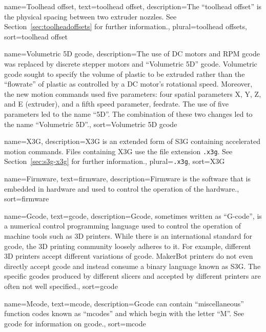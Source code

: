 {
        name={Toolhead offset},
        text={toolhead offset},
        description={The ``toolhead offset'' is the physical spacing between
two extruder nozzles.  See Section~\ref{sec:toolheadoffsets} for further
information.},
        plural={toolhead offsets},
        sort=toolhead offset
}

{
        name={Volumetric 5D gcode},
        description={The use of DC motors and RPM gcode was replaced
by discrete stepper motors and ``Volumetric 5D'' gcode.  Volumetric gcode
sought to specify the volume of plastic to be extruded rather than the
``flowrate'' of plastic as controlled by a DC motor's rotational speed.
Moreover, the new motion commands used five parameters: four spatial
parameters X, Y, Z, and E (extruder), and a fifth speed parameter, feedrate.
The use of five parameters led to the name ``5D''.  The combination of
these two changes led to the name ``Volumetric 5D''.},
        sort=Volumetric 5D gcode
}

{
        name={X3G},
        description={X3G is an extended form of \gls{S3G} containing accelerated
motion commands. Files containing X3G use the file extension \texttt{.x3g}.
See Section~\ref{sec:s3g-x3g} for further information.},
        plural={\texttt{.x3g}},
        sort=X3G
}

{
        name={Firmware},
        text={firmware},
        description={Firmware is the software that is embedded in hardware
and used to control the operation of the hardware.},
        sort=firmware
}

{
        name={Gcode},
        text={gcode},
        description={Gcode, sometimes written as ``G-code'', is a numerical control programming language used
to control the operation of machine tools such as 3D printers.  While there is an international standard
for gcode, the 3D printing community loosely adheres to it.  For example,
different 3D printers accept different variations of gcode.  MakerBot
printers do not even directly accept gcode and instead consume a binary
language known as S3G.  The specific gcodes produced by different
slicers and accepted by different printers are often not well specified.},
        sort=gcode
}

{
        name={Mcode},
        text={mcode},
        description={Gcode can contain ``miscellaneous'' function codes
known as ``mcodes'' and which begin with the letter ``M''.  See \gls{gcode}
for information on gcode.},
        sort=mcode
}

